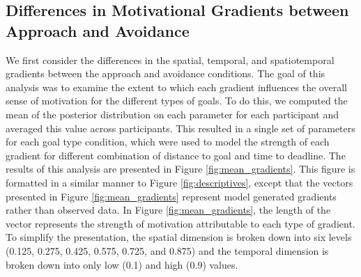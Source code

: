 \documentclass[a4paper,doc,natbib,donotrepeattitle]{apa6}
\begin{document}
\subsection{Differences in Motivational Gradients between Approach and Avoidance}

We first consider the differences in the spatial, temporal, and spatiotemporal gradients between the approach and avoidance conditions. The goal of this analysis was to examine the extent to which each gradient influences the overall sense of motivation for the different types of goals. To do this, we computed the mean of the posterior distribution on each parameter for each participant and averaged this value across participants. This resulted in a single set of parameters for each goal type condition, which were used to model the strength of each gradient for different combination of distance to goal and time to deadline. The results of this analysis are presented in Figure \ref{fig:mean_gradients}. This figure is formatted in a similar manner to Figure \ref{fig:descriptives}, except that the vectors presented in Figure \ref{fig:mean_gradients} represent model generated gradients rather than observed data. In Figure \ref{fig:mean_gradients}, the length of the vector represents the strength of motivation attributable to each type of gradient.
To simplify the presentation, the spatial dimension is broken down into six levels (0.125, 0.275, 0.425, 0.575, 0.725, and 0.875) and the temporal dimension is broken down into only low (0.1) and high (0.9) values.
\end{document}
